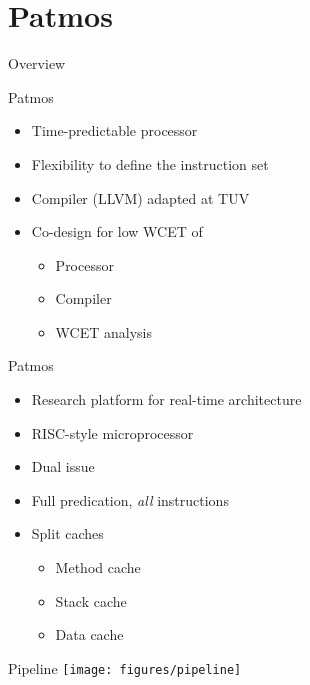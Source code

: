\documentclass[17pt]{beamer}
\begin{document}
\section{Patmos}

\begin{frame}{Overview}
  \tableofcontents[currentsection]
\end{frame}

\begin{frame}{Patmos}
  \begin{itemize}
  \item Time-predictable processor
  \item Flexibility to define the instruction set
  \item Compiler (LLVM) adapted at TUV
  \item Co-design for low WCET of
    \begin{itemize}
    \item Processor
    \item Compiler
    \item WCET analysis
    \end{itemize}
  \end{itemize}
\end{frame}

\begin{frame}[shrink=5]{Patmos}
  \begin{itemize}
  \item Research platform for real-time architecture
  \item RISC-style microprocessor
  \item Dual issue
  \item Full predication, \emph{all} instructions
  \item Split caches
    \begin{itemize}
    \item Method cache
    \item Stack cache
    \item Data cache
    \end{itemize}
  \end{itemize}
\end{frame}

\begin{frame}{Pipeline}
  \texttt{[image: figures/pipeline]}
\end{frame}
\end{document}
